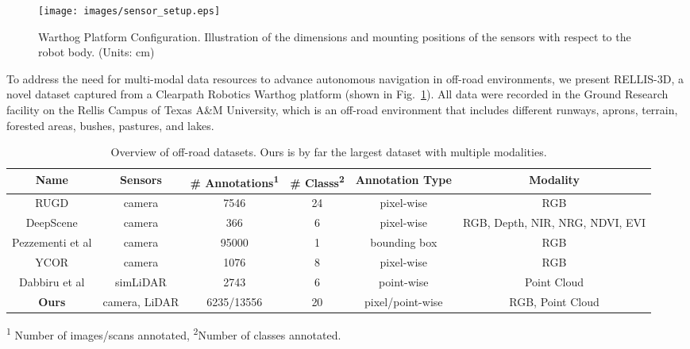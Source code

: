 \documentclass[letterpaper, 10 pt, conference]{ieeeconf}
\begin{document}
\begin{figure}
  \centering
  \texttt{[image: images/sensor\_setup.eps]}
  \caption{Warthog Platform Configuration. Illustration of the dimensions and mounting positions of the sensors with respect to the robot body. (Units: cm) }
  \label{fig:sensor_setup}
\end{figure}
\vspace{-5pt} 
To address the need for multi-modal data resources to advance autonomous navigation in off-road environments, we present RELLIS-3D, a novel dataset captured from a Clearpath Robotics Warthog platform (shown in Fig.~\ref{fig:sensor_setup}). All data were recorded in the Ground Research facility on the Rellis Campus of Texas A\&M University, which is an off-road environment that includes different runways, aprons, terrain, forested areas, bushes, pastures, and lakes.
\begin{table*}[h]
\centering
\vspace{10pt}
\caption{Overview of off-road datasets. Ours is by far the largest dataset with multiple modalities.}
\begin{tabular}{c|c|c|c|c|c}
\hline
Name             & Sensors       & \# Annotations\textsuperscript{1}        & \# Classs\textsuperscript{2} & Annotation Type      & Modality                        \\
\hline
RUGD \cite{RUGD2019IROS}            & camera        & 7546       & 24     & pixel-wise       & RGB                             \\
\hline
DeepScene \cite{valada16iser}        & camera        & 366        & 6      & pixel-wise       & RGB, Depth, NIR, NRG, NDVI, EVI \\
\hline
Pezzementi et al \cite{Pezzementi2018} & camera        & 95000      & 1      & bounding box     & RGB                             \\
\hline
YCOR \cite{Maturana2018}             & camera        & 1076       & 8      & pixel-wise       & RGB                             \\
\hline
Dabbiru et al \cite{Dabbiru2020}    & simLiDAR      & 2743       & 6      & point-wise       & Point Cloud                     \\
\hline
\textbf{Ours}             & camera, LiDAR & 6235/13556 & 20     & pixel/point-wise & RGB, Point Cloud                \\
\hline
\end{tabular}

\begin{tablenotes}
\centering
  \small
  \item  \textsuperscript{1} Number of images/scans annotated, \textsuperscript{2}Number of classes annotated.
\end{tablenotes}
\label{tbl:dataset_tabel}
\vspace{-10pt}

\end{table*}
\end{document}

